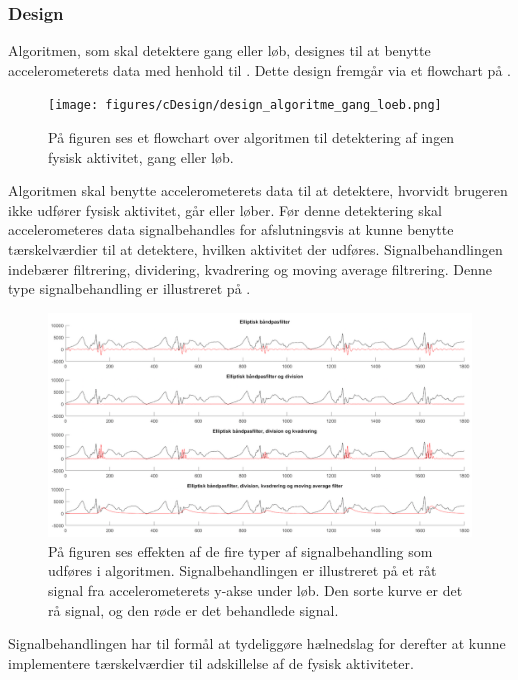 \subsubsection{Design} \label{design_algo_g_l}
Algoritmen, som skal detektere gang eller løb, designes til at benytte accelerometerets data med henhold til . Dette design fremgår via et flowchart på .
\begin{figure}[H]
	\centering
	\texttt{[image: figures/cDesign/design\_algoritme\_gang\_loeb.png]}
	\caption{På figuren ses et flowchart over algoritmen til detektering af ingen fysisk aktivitet, gang eller løb.}
	\label{fig:design_algoritme_gang_loeb}
\end{figure}
Algoritmen skal benytte accelerometerets data til at detektere, hvorvidt brugeren ikke udfører fysisk aktivitet, går eller løber. Før denne detektering skal accelerometeres data signalbehandles for afslutningsvis at kunne benytte tærskelværdier til at detektere, hvilken aktivitet der udføres. Signalbehandlingen indebærer filtrering, dividering, kvadrering og moving average filtrering. Denne type signalbehandling er illustreret på .
\begin{figure}[H]
	\centering
	\includegraphics[width=1\textwidth]{figures/cDesign/signalbehandling_psoc.png}
	\caption{På figuren ses effekten af de fire typer af signalbehandling som udføres i algoritmen. Signalbehandlingen er illustreret på et råt signal fra accelerometerets y-akse under løb. Den sorte kurve er det rå signal, og den røde er det behandlede signal.}
	\label{fig:algoritme_behandling}
\end{figure}
Signalbehandlingen har til formål at tydeliggøre hælnedslag for derefter at kunne implementere tærskelværdier til adskillelse af de fysisk aktiviteter. \\
